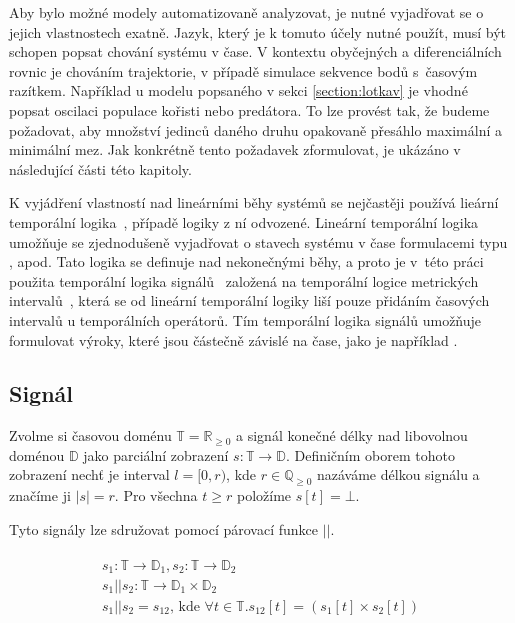 Aby bylo možné modely automatizovaně analyzovat, je nutné vyjadřovat se o jejich
vlastnostech exatně. Jazyk, který je k tomuto účely nutné použít, musí být schopen 
popsat chování systému v čase. V kontextu obyčejných a di\-fe\-ren\-ci\-ál\-ních rovnic je
chováním trajektorie, v případě simulace sekvence bodů s~časovým razítkem. Například u modelu
popsaného v sekci \ref{section:lotkav} je vhodné popsat oscilaci populace kořisti
nebo predátora. To lze provést tak, že budeme požadovat, aby množství jedinců
daného druhu opakovaně pře\-sáh\-lo maximální a minimální mez. Jak konkrétně
tento po\-ža\-da\-vek zformulovat, je ukázáno v následující části této kapitoly.

K vyjádření vlastností nad lineárními běhy systémů se nejčastěji používá lieární
temporální logika~\cite{strejcek2007}, případě logiky z ní odvozené.
Lineární temporální logika u\-mož\-ňu\-je se zjednodušeně vyjadřovat o sta\-vech
systému v čase formulacemi typu ,  apod.
Tato logika se definuje nad nekonečnými běhy, a proto je v~této práci použita temporální logika
signálů~\cite{maler2004} založená na temporální logice metrických intervalů~\cite{alur1996},
která se od lineární temporální logiky liší pouze přidáním ča\-so\-vých intervalů u temporálních operátorů. Tím temporální
logika signálů u\-mož\-ňu\-je formulovat výroky, které jsou částečně závislé na čase, jako
je například  .

\subsection{Signál}

Zvolme si časovou doménu $\mathbb{T} = \mathbb{R}_{\geq 0}$ a signál konečné délky
nad libovolnou doménou $\mathbb{D}$ jako parciální zobrazení $s: \mathbb{T} \rightarrow \mathbb{D}$.
Definičním oborem tohoto zobrazení nechť je interval $l = [0, r)$, kde $r \in \mathbb{Q}_{\geq0}$ nazáváme
délkou signálu a značíme ji $|s| = r$. Pro všechna $t \geq r$ položíme $s[t] = \bot$.

Tyto signály lze sdružovat pomocí párovací funkce $||$.

\begin{align}\label{eq:signals:pairing}
\begin{array}{ll}
s_1: \mathbb{T} \rightarrow \mathbb{D}_1, s_2: \mathbb{T} \rightarrow \mathbb{D}_2	\\
s_1 || s_2: \mathbb{T} \rightarrow \mathbb{D}_1 \times\mathbb{D}_2		\\
s_1 || s_2= s_{12}\textrm{, kde }\forall t\in\mathbb{T}. s_{12}[t] = (s_1[t] \times s_2[t])
\end{array}
\end{align}

